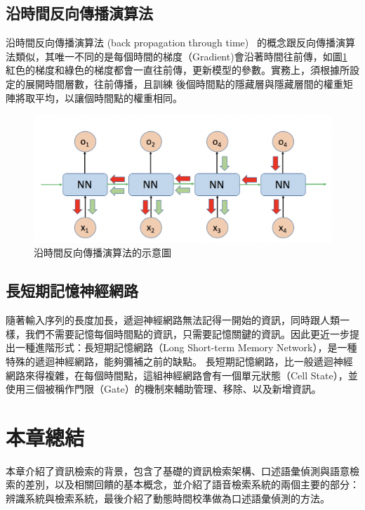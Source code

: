 \subsection{沿時間反向傳播演算法}
沿時間反向傳播演算法 (back propagation through time)~\cite{werbos1990backpropagation}
的概念跟反向傳播演算法類似，其唯一不同的是每個時間的梯度（Gradient)會沿著時間往前傳，如圖\ref{fig:ch2_BPTT}
紅色的梯度和綠色的梯度都會一直往前傳，更新模型的參數。實務上，須根據所設定的展開時間層數，往前傳播，且訓練
後個時間點的隱藏層與隱藏層間的權重矩陣將取平均，以讓個時間點的權重相同。
\begin{figure}[ht]
\centering
\includegraphics[scale=0.5]{images/ch2_BPTT.png}
\caption{沿時間反向傳播演算法的示意圖} \label{fig:ch2_BPTT}
\end{figure}

\subsection{長短期記憶神經網路}
隨著輸入序列的長度加長，遞迴神經網路無法記得一開始的資訊，同時跟人類一樣，我們不需要記憶每個時間點的資訊，只需要記憶關鍵的資訊。因此更近一步提出一種進階形式：長短期記憶網路（Long Short-term Memory
Network）\cite{gers2001long}，是一種特殊的遞迴神經網路，能夠彌補之前的缺點。
長短期記憶網路，比一般遞迴神經網路來得複雜，在每個時間點，這組神經網路會有一個單元狀態（Cell
State），並使用三個被稱作門限（Gate）的機制來輔助管理、移除、以及新增資訊。\cite{shen2016}

\section{本章總結}
本章介紹了資訊檢索的背景，包含了基礎的資訊檢索架構、口述語彙偵測與語意檢索的差別，以及相關回饋的基本概念，並介紹了語音檢索系統的兩個主要的部分：辨識系統與檢索系統，最後介紹了動態時間校準做為口述語彙偵測的方法。
